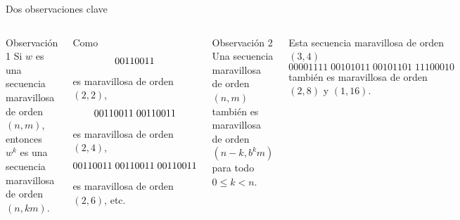 \documentclass[spanish,xcolor={table}]{beamer}
\begin{document}

\begin{frame}{Dos observaciones clave}

\begin{columns}

  \begin{block}{Observación 1}
    Si $w$ es una secuencia maravillosa de orden $(n,m)$, entonces \\
    $w^k$ es una secuencia maravillosa de orden $(n,km)$.
  \end{block}
  
  \begin{example}
    Como \vspace{-.4em}
    \[ 00110011 \vspace{-.4em} \]
    es maravillosa de orden $(2,2)$, \vspace{-.4em}
    \[ 00110011\;00110011 \vspace{-.4em} \]
    es maravillosa de orden $(2,4)$, \vspace{-.4em}
    \[ 00110011\;00110011\;00110011 \vspace{-.4em} \]
    es maravillosa de orden $(2,6)$, etc.

  \end{example}

  \begin{block}{Observación 2}
    Una secuencia maravillosa \\
    de orden $(n,m)$ también es
    maravillosa de orden $(n-k,b^km)$
    para todo $0 \leq k < n$.
  \end{block}
  
  \begin{example}
    Esta secuencia maravillosa de orden $(3,4)$
    {\small
      \[ 00001111\;00101011\;00101101\;11100010 \]
    }
    también es maravillosa de orden $(2,8)$ y $(1,16)$.
  \end{example}
\end{columns}

\end{frame}

\end{document}
